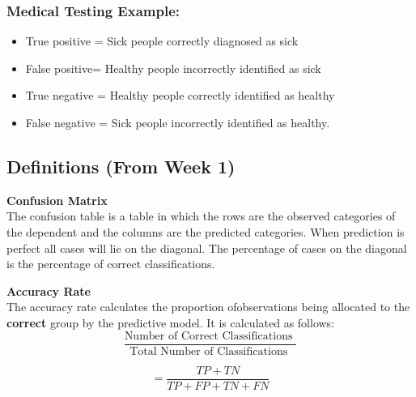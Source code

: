 \documentclass[a4paper,12pt]{article}
\begin{document}
\subsubsection*{Medical Testing Example:}
\begin{itemize}
	\item True positive = Sick people correctly diagnosed as sick
	
	\item False positive= Healthy people incorrectly identified as sick
	
	\item True negative = Healthy people correctly identified as healthy
	
	\item False negative = Sick people incorrectly identified as healthy.
\end{itemize}


\newpage
\subsection{Definitions (From Week 1)}
\textbf{Confusion Matrix} \\
The confusion
table is a table in which the rows are the observed categories of the dependent and
the columns are the predicted categories. When prediction is perfect all cases will lie on the
diagonal. The percentage of cases on the diagonal is the percentage of correct classifications. 

\textbf{Accuracy Rate}\\
The accuracy rate calculates the proportion ofobservations being allocated to the \textbf{correct} group by the predictive model. It is calculated as follows:
\[ \frac{
\mbox{Number of Correct Classifications }}{\mbox{Total Number of Classifications }} \]

\[ = \frac{TP + TN}{TP+FP+TN+FN}\]

\medskip
\end{document}
